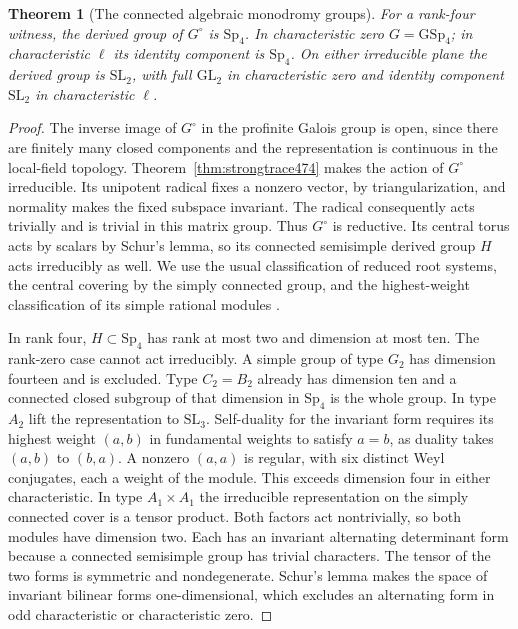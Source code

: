 \documentclass[a4paper,11pt]{article}
\newtheorem{theorem}[proposition]{Theorem}
\theoremstyle{definition}
\theoremstyle{remark}
\numberwithin{equation}{section}
\begin{document}
\begin{theorem}[The connected algebraic monodromy groups]\leavevmode
\label{thm:monodromy476}
For a rank-four witness, the derived group of \(G^\circ\) is
\(\mathrm{Sp}_4\). In characteristic zero \(G=\mathrm{GSp}_4\);
in characteristic \(\ell\) its identity component is
\(\mathrm{Sp}_4\). On either irreducible plane the derived group
is \(\mathrm{SL}_2\), with full \(\mathrm{GL}_2\) in
characteristic zero and identity component \(\mathrm{SL}_2\)
in characteristic \(\ell\).
\end{theorem}
\begin{proof}
The inverse image of \(G^\circ\) in the profinite Galois group
is open, since there are finitely many closed components and the
representation is continuous in the local-field topology.
Theorem~\ref{thm:strongtrace474} makes the action of \(G^\circ\)
irreducible. Its unipotent radical fixes a nonzero vector, by
triangularization, and normality makes the fixed subspace
invariant. The radical consequently acts trivially and is
trivial in this matrix group. Thus \(G^\circ\) is reductive.
Its central torus acts by scalars by Schur's lemma, so its
connected semisimple derived group \(H\) acts irreducibly as
well. We use the usual classification of reduced root systems,
the central covering by the simply connected group, and the
highest-weight classification of its simple rational modules
\cite{IX-VII-VI-milne122}.

In rank four, \(H\subset\mathrm{Sp}_4\) has rank at most two
and dimension at most ten. The rank-zero case cannot act
irreducibly. A simple group of type \(G_2\) has dimension
fourteen and is excluded. Type \(C_2=B_2\) already has
dimension ten and a connected closed subgroup of that dimension
in \(\mathrm{Sp}_4\) is the whole group. In type \(A_2\) lift
the representation to \(\mathrm{SL}_3\). Self-duality for the
invariant form requires its highest weight \((a,b)\) in
fundamental weights to satisfy \(a=b\), as duality takes
\((a,b)\) to \((b,a)\). A nonzero \((a,a)\) is regular, with
six distinct Weyl conjugates, each a weight of the module.
This exceeds dimension four in either characteristic. In type
\(A_1\times A_1\) the irreducible representation on the
simply connected cover is a tensor product. Both factors act
nontrivially, so both modules have dimension two. Each has
an invariant alternating determinant form because a connected
semisimple group has trivial characters. The tensor of the two
forms is symmetric and nondegenerate. Schur's lemma makes
the space of invariant bilinear forms one-dimensional, which
excludes an alternating form in odd characteristic or
characteristic zero.


\end{proof}
\end{document}
